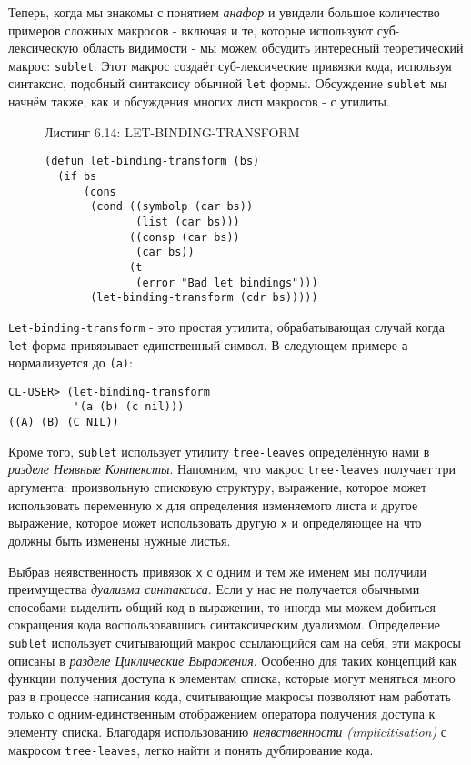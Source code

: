 Теперь, когда мы знакомы с понятием \emph{анафор} и увидели большое количество примеров сложных макросов - включая и те, которые используют суб-лексическую область видимости - мы можем обсудить интересный теоретический макрос: \verb"sublet". Этот макрос создаёт суб-лексические привязки кода, используя синтаксис, подобный синтаксису обычной \verb"let" формы. Обсуждение \verb"sublet" мы начнём также, как и обсуждения многих лисп макросов - с утилиты.

\begin{figure}Листинг 6.14: LET-BINDING-TRANSFORM\label{listing_6.14}
\listbegin
\begin{verbatim}
(defun let-binding-transform (bs)
  (if bs
      (cons
       (cond ((symbolp (car bs))
              (list (car bs)))
             ((consp (car bs))
              (car bs))
             (t
              (error "Bad let bindings")))
       (let-binding-transform (cdr bs)))))
\end{verbatim}
\listend
\end{figure}

\verb"Let-binding-transform" - это простая утилита, обрабатывающая случай когда \verb"let" форма привязывает единственный символ. В следующем примере \verb"a" нормализуется до \verb"(a)":

\begin{verbatim}
CL-USER> (let-binding-transform
          '(a (b) (c nil)))
((A) (B) (C NIL))
\end{verbatim}

Кроме того, \verb"sublet" использует утилиту \verb"tree-leaves" определённую нами в \emph{разделе Неявные Контексты}. Напомним, что макрос \verb"tree-leaves" получает три аргумента: произвольную списковую структуру, выражение, которое может использовать переменную \verb"x" для определения изменяемого листа и другое выражение, которое может использовать другую \verb"x" и определяющее на что должны быть изменены нужные листья.

Выбрав неявственность привязок \verb"x" с одним и тем же именем мы получили преимущества \emph{дуализма синтаксиса}. Если у нас не получается обычными способами выделить общий код в выражении, то иногда мы можем добиться сокращения кода воспользовавшись синтаксическим дуализмом. Определение \verb"sublet" использует считывающий макрос ссылающийся сам на себя, эти макросы описаны в \emph{разделе Циклические Выражения}. Особенно для таких концепций как функции получения доступа к элементам списка, которые могут меняться много раз в процессе написания кода, считывающие макросы позволяют нам работать только с одним-единственным отображением оператора получения доступа к элементу списка. Благодаря использованию \emph{неявственности (implicitisation)} с макросом \verb"tree-leaves", легко найти и понять дублирование кода.

